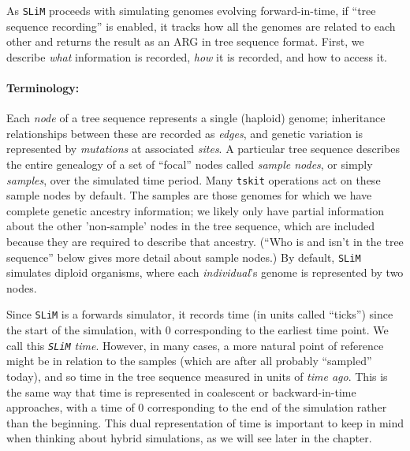 \documentclass[12pt]{article}
\newcommand{\tskit}[0]{\texttt{tskit}\xspace}
\newcommand{\slim}[0]{\texttt{SLiM}\xspace}
\begin{document}
As \slim proceeds with simulating genomes evolving forward-in-time, 
if ``tree sequence recording'' is enabled,
it tracks how all the genomes are
related to each other and returns the result as an ARG in tree sequence format. First, we describe
\emph{what} information is recorded, \emph{how} it is recorded, and how to access it.

\paragraph{Terminology:}
Each \textit{node} of a tree sequence represents a single (haploid) genome;
inheritance relationships between these are recorded as \textit{edges},
and genetic variation is represented by \textit{mutations} at associated \textit{sites}.
A particular tree sequence describes the entire genealogy of a set of ``focal'' nodes called
\textit{sample nodes}, or simply \textit{samples}, over the simulated time period.
Many \tskit operations act on these sample nodes by default.
The samples are those genomes for which we have complete genetic ancestry information; 
we likely only have partial information about the other 'non-sample' nodes in the tree sequence,
which are included because they are required to describe that ancestry.
(``Who is and isn't in the tree sequence'' below gives more detail about sample nodes.)
By default, \slim simulates diploid organisms, where each \textit{individual}'s genome is represented by two nodes.

Since \slim is a forwards simulator, it records time (in units called ``ticks'')
since the start of the simulation, with 0 corresponding to the earliest time point.
We call this \textit{\slim time}.
However, in many cases, a more natural point of reference might be in relation to the samples
(which are after all probably ``sampled'' today),
and so time in the tree sequence measured in units of \textit{time ago}.
This is the same way that time
is represented in coalescent or backward-in-time approaches, with a time of 0 corresponding
to the end of the simulation rather than the beginning.
This dual representation of time is important
to keep in mind when thinking about hybrid simulations, as we will see later in the chapter.
\end{document}

